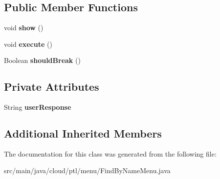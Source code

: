 \subsection*{Public Member Functions}
\begin{DoxyCompactItemize}
\item 
\mbox{\label{classcloud_1_1ptl_1_1menu_1_1FindByNameMenu_a55d24427391d7341248eee0d668cef73}} 
void {\bfseries show} ()
\item 
\mbox{\label{classcloud_1_1ptl_1_1menu_1_1FindByNameMenu_ab1f6f91ed991a1c65da41e45ee5be066}} 
void {\bfseries execute} ()
\item 
\mbox{\label{classcloud_1_1ptl_1_1menu_1_1FindByNameMenu_a91da30bf29cf692109de3e23391a7c73}} 
Boolean {\bfseries should\+Break} ()
\end{DoxyCompactItemize}
\subsection*{Private Attributes}
\begin{DoxyCompactItemize}
\item 
\mbox{\label{classcloud_1_1ptl_1_1menu_1_1FindByNameMenu_a332e611bd46ff34cd1b6e9dd935f7f65}} 
String {\bfseries user\+Response}
\end{DoxyCompactItemize}
\subsection*{Additional Inherited Members}


The documentation for this class was generated from the following file\+:\begin{DoxyCompactItemize}
\item 
src/main/java/cloud/ptl/menu/Find\+By\+Name\+Menu.\+java\end{DoxyCompactItemize}
